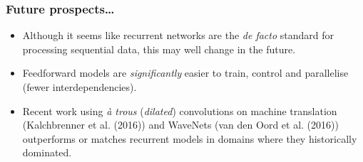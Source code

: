 \documentclass{beamer}
\begin{document}
\begin{frame}
	\frametitle{Future prospects\dots}
	\begin{itemize}
		\item Although it seems like recurrent networks are the \emph{de facto} standard for processing sequential data, this may well change in the future.
		\vfill
		\item Feedforward models are \emph{significantly} easier to train, control and parallelise (fewer interdependencies).
		\vfill
		\item Recent work using \emph{\`{a} trous} (\emph{dilated}) convolutions on machine translation (Kalchbrenner et al. (2016)) and WaveNets (van den Oord et al. (2016)) outperforms or matches recurrent models in domains where they historically dominated.
	\end{itemize}
\end{frame}
\end{document}
